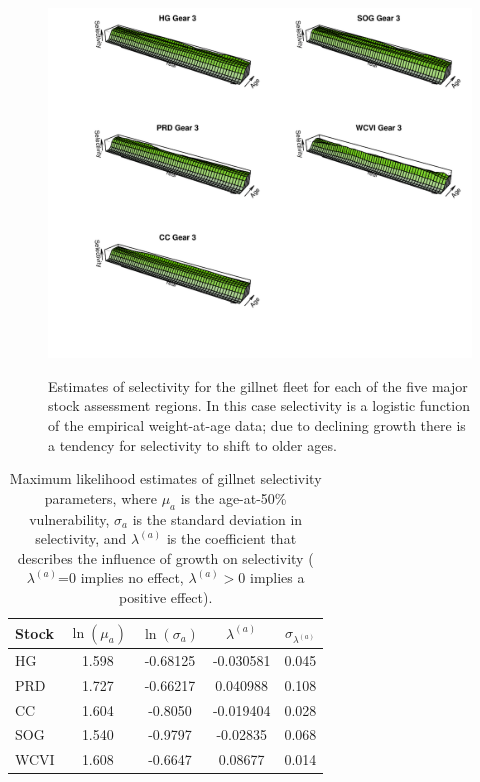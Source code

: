 \begin{figure}[!tbp]
	\includegraphics[width=\textwidth]{../FIGS/qPriorFigs/iscam_fig_gill_net_selectivity.pdf}\\
	\caption{Estimates of selectivity for the gillnet fleet for each of the five major stock assessment regions. In this case selectivity is a logistic function of the empirical weight-at-age data; due to declining growth there is a tendency for selectivity to shift to older ages.}\label{PartII:Results:figGillNetSel}
\end{figure}


\begin{table}[htdp]
\caption{Maximum likelihood estimates of gillnet selectivity parameters, where $\mu_a$ is the age-at-50\% vulnerability, $\sigma_a$ is the standard deviation in selectivity, and $\lambda^{(a)}$ is the coefficient that describes the influence of growth on selectivity ($\lambda^{(a)}$=0 implies no effect, $\lambda^{(a)}>0$ implies a positive effect).}
\begin{center}
\begin{tabular}{lcccc}
\hline
Stock 	& $\ln(\mu_a)$ 	& $\ln(\sigma_a)$	& $\lambda^{(a)}$ &$\sigma_{\lambda^{(a)}}$\\
\hline
HG		&	 1.598		&	-0.68125		&	-0.030581 &	0.045 \\
PRD		&    1.727		&   -0.66217		&    0.040988 & 0.108 \\
CC		&    1.604 		&   -0.8050        &   -0.019404  & 0.028 \\
SOG		&	 1.540		&   -0.9797			&   -0.02835  & 0.068 \\
WCVI	& 	 1.608		&   -0.6647			& 	 0.08677  & 0.014\\
\hline
\end{tabular}
\end{center}
\label{PartII:Table:GN_Sel_par}
\end{table}%


